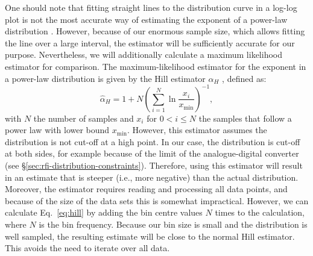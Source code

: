 \documentclass[useAMS,usenatbib]{mn2e}
\begin{document}
One should note that fitting straight lines to the distribution curve in a log-log plot is not the most accurate way of estimating the exponent of a power-law distribution \citep{power-law-distribution}. However, because of our enormous sample size, which allows fitting the line over a large interval, the estimator will be sufficiently accurate for our purpose. Nevertheless, we will additionally calculate a maximum likelihood estimator for comparison. The maximum-likelihood estimator for the exponent in a power-law distribution is given by the Hill estimator $\hat \alpha_H$ \citep{hill-estimator, power-law-distribution}, defined as:
\begin{equation} \label{eq:hill}
 \hat \alpha_H = 1 + N \left(\sum\limits_{i=1}^{N} \ln \frac{x_i}{x_\textrm{min}} \right)^{-1},
\end{equation}
with $N$ the number of samples and $x_i$ for $0 < i \le N$ the samples that follow a power law with lower bound $x_\textrm{min}$.
However, this estimator assumes the distribution is not cut-off at a high point. In our case, the distribution is cut-off at both sides, for example because of the limit of the analogue-digital converter (see \S\ref{sec:rfi-distribution-constraints}). Therefore, using this estimator will result in an estimate that is steeper (i.e., more negative) than the actual distribution. Moreover, the estimator requires reading and processing all data points, and because of the size of the data sets this is somewhat impractical. However, we can calculate Eq.~\eqref{eq:hill} by adding the bin centre values $N$ times to the calculation, where $N$ is the bin frequency. Because our bin size is small and the distribution is well sampled, the resulting estimate will be close to the normal Hill estimator. This avoids the need to iterate over all data.
\end{document}
